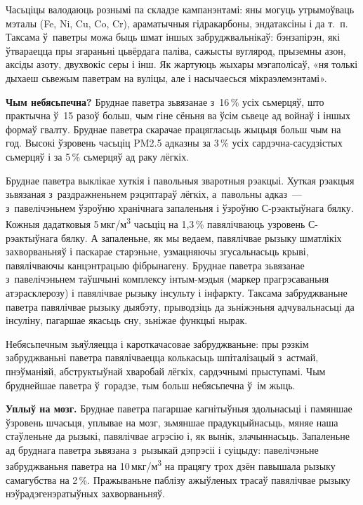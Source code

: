 Часьціцы валодаюць рознымі па складзе кампанэнтамі: яны могуць утрымоўваць мэталы (Fe, Ni, Cu, Co, Cr), араматычныя гідракарбоны, эндатаксіны і да т.~п. Таксама ў~паветры можа быць шмат іншых забруджвальнікаў: бэнзапірэн, які ўтвараецца пры згараньні цьвёрдага паліва, сажысты вуглярод, прыземны азон, аксіды азоту, двухвокіс серы і інш. Як жартуюць жыхары мэгаполісаў, «ня толькі дыхаеш сьвежым паветрам на вуліцы, але і насычаесься мікраэлемэнтамі».

\textbf{Чым небясьпечна?} Бруднае паветра зьвязанае з~16\,\% усіх сьмерцяў, што практычна ў~15 разоў больш, чым гіне сёньня ва ўсім сьвеце ад войнаў і іншых формаў гвалту. Бруднае паветра скарачае працягласьць жыцьця больш чым на год. Высокі ўзровень часьціц PM2.5 адказны за 3\,\% усіх сардэчна-сасудзістых сьмерцяў і за 5\,\% сьмерцяў ад раку лёгкіх.


Бруднае паветра выклікае хуткія і павольныя зваротныя рэакцыі. Хуткая рэакцыя зьвязаная з~раздражненьнем рэцэптараў лёгкіх, а~павольны адказ~--- з~павелічэньнем ўзроўню хранічнага запаленьня і ўзроўню С-рэактыўнага бялку. Кожныя дадатковыя 5\,мкг/м\textsuperscript{3} часьціц на 1,3\,\% павялічваюць узровень С-рэактыўнага бялку. А запаленьне, як мы ведаем, павялічвае рызыку шматлікіх захворваньняў і паскарае старэньне, узмацняючы згусальнасьць крыві, павялічваючы канцэнтрацыю фібрынагену. Бруднае паветра зьвязанае з~павелічэньнем таўшчыні комплексу інтым-мэдыя (маркер прагрэсаваньня атэрасклерозу) і павялічвае рызыку інсульту і інфаркту. Таксама забруджваньне паветра павялічвае рызыку дыябэту, прыводзіць да зьніжэньня адчувальнасьці да інсуліну, пагаршае якасьць сну, зьніжае функцыі нырак.

Небясьпечным зьяўляецца і кароткачасовае забруджваньне: пры рэзкім забруджваньні паветра павялічваецца колькасьць шпіталізацый з~астмай, пнэўманіяй, абструктыўнай хваробай лёгкіх, сардэчнымі прыступамі. Чым бруднейшае паветра ў~горадзе, тым больш небясьпечна ў~ім жыць.

\textbf{Уплыў на мозг.} Бруднае паветра пагаршае кагнітыўныя здольнасьці і памяншае ўзровень шчасьця, уплывае на мозг, зьмяншае прадукцыйнасьць, мяняе наша стаўленьне да рызыкі, павялічвае агрэсію і, як вынік, злачыннасьць. Запаленьне ад бруднага паветра зьвязана з~рызыкай дэпрэсіі і суіцыду: павелічэньне забруджваньня паветра на 10\,мкг/м\textsuperscript{3} на працягу трох дзён павышала рызыку самагубства на 2\,\%. Пражываньне паблізу ажыўленых трасаў павялічвае рызыку нэўрадэгенэратыўных захворваньняў.

